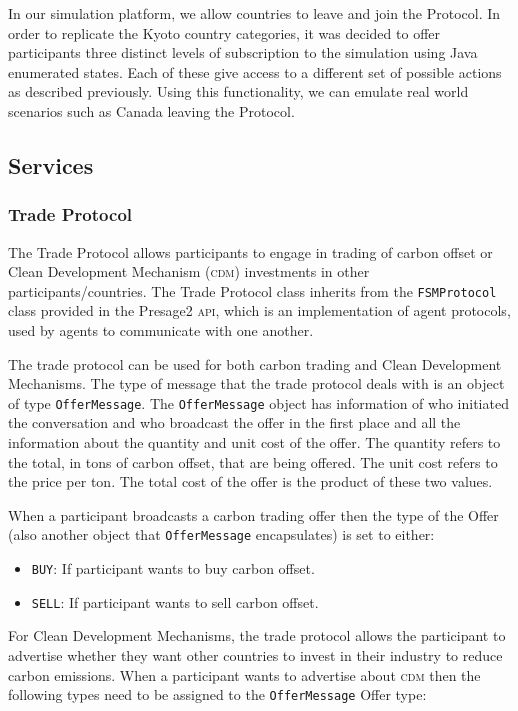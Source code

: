 In our simulation platform, we allow countries to leave and join the Protocol. In order to replicate the Kyoto country categories, it was decided to offer participants three distinct levels of subscription to the simulation using Java enumerated states. Each of these give access to a different set of possible actions as described previously. Using this functionality, we can emulate real world scenarios such as Canada leaving the Protocol.

\subsection{Services}

\subsubsection{Trade Protocol}

The Trade Protocol allows participants to engage in trading of carbon offset or Clean Development Mechanism (\textsc{cdm}) investments in other participants/countries. The Trade Protocol class inherits from the \texttt{FSMProtocol} class provided in the Presage2 \textsc{api}, which is an implementation of agent protocols, used by agents to communicate with one another.
 
The trade protocol can be used for both carbon trading and Clean Development Mechanisms. The type of message that the trade protocol deals with is an object of type \texttt{OfferMessage}. The \texttt{OfferMessage} object has information of who initiated the conversation and who broadcast the offer in the first place and all the information about the quantity and unit cost of the offer. The quantity refers to the total, in tons of carbon offset, that are being offered. The unit cost refers to the price per ton. The total cost of the offer is the product of these two values.

When a participant broadcasts a carbon trading offer then the type of the Offer (also another 
object that \texttt{OfferMessage} encapsulates) is set to either:
 
\begin{itemize}
	\item \texttt{BUY}: If participant wants to buy carbon offset.
	\item \texttt{SELL}: If participant wants to sell carbon offset.
\end{itemize}

For Clean Development Mechanisms, the trade protocol allows the participant to advertise whether they want other countries to invest in their industry to reduce carbon emissions. When a participant wants to advertise about \textsc{cdm} then the following types need to be assigned to the \texttt{OfferMessage} Offer type:

